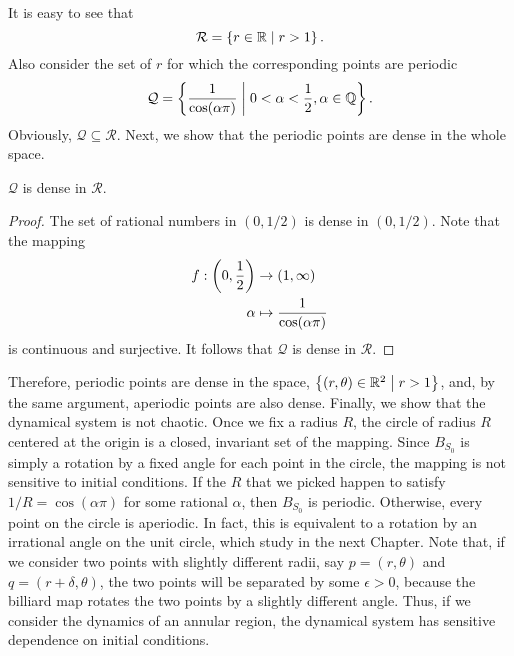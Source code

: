 \documentclass[10pt,twoside]{book}
\begin{document}
It is easy to see that
\begin{equation*}
  \mathcal{R} = \left \{ r \in \mathbb{R} \mathrel{} \middle| \mathrel{} r > 1 \right \}.
\end{equation*}
Also consider the set of $r$ for which the corresponding points are periodic
\begin{equation*}
  \mathcal{Q} = \left \{ \frac{1}{\cos(\alpha\pi)} \mathrel{} \middle| \mathrel{} 0 < \alpha < \frac{1}{2}, \alpha \in \mathbb{Q} \right \}.
\end{equation*}
Obviously, $\mathcal{Q} \subseteq \mathcal{R}$.
Next, we show that the periodic points are dense in the whole space.
\begin{proposition}
  $\mathcal{Q}$ is dense in $\mathcal{R}$.
  \begin{proof}
  The set of rational numbers in $(0,1/2)$ is dense in $(0,1/2)$.
  Note that the mapping
    \begin{align*}
      f: \left ( 0,\frac{1}{2} \right ) &\to (1, \infty)  \\
      \alpha &\mapsto \frac{1}{\cos(\alpha\pi)}
    \end{align*}
  is continuous and surjective.
  It follows that $\mathcal{Q}$ is dense in $\mathcal{R}$.
  \end{proof}
\end{proposition}
Therefore, periodic points are dense in the space, $\left \{ (r, \theta) \in \mathbb{R}^2 \mathrel{} \middle| \mathrel{} r > 1 \right \}$, and, by the same argument, aperiodic points are also dense.
Finally, we show that the dynamical system is not chaotic.
Once we fix a radius $R$, the circle of radius $R$ centered at the origin is a closed, invariant set of the mapping.
Since $B_{S_0}$ is simply a rotation by a fixed angle for each point in the circle, the mapping is not sensitive to initial conditions.
If the $R$ that we picked happen to satisfy $1/R = \cos(\alpha\pi)$ for some rational $\alpha$, then $B_{S_0}$ is periodic.
Otherwise, every point on the circle is aperiodic.
In fact, this is equivalent to a rotation by an irrational angle on the unit circle, which study in the next Chapter.
Note that, if we consider two points with slightly different radii, say $p = (r, \theta)$ and $q = (r + \delta, \theta)$, the two points will be separated by some $\epsilon > 0$, because the billiard map rotates the two points by a slightly different angle.
Thus, if we consider the dynamics of an annular region, the dynamical system has sensitive dependence on initial conditions.
\end{document}
